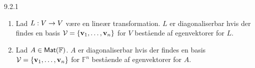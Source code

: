 %
%

\begin{definition}{9.2.1}
	\begin{enumerate}
		\item Lad $L : V \rightarrow V$ være en lineær transformation. $L$ er
			diagonaliserbar hvis der findes en basis $\mathcal{V} = \{ \mathbf{v}_1, \dotsc,
			\mathbf{v}_n \}$ for $V$ bestående af egenvektorer for $L$.
		\item Lad $A \in \textsf{Mat}(\mathbb{F})$. $A$ er diagonaliserbar hvis der
			findes en basis $\mathcal{V} = \{ \mathbf{v}_1, \dotsc, \mathbf{v}_n \}$ for
			$\mathbb{F}^n$ bestående af egenvektorer for $A$.
	\end{enumerate}
\end{definition}
